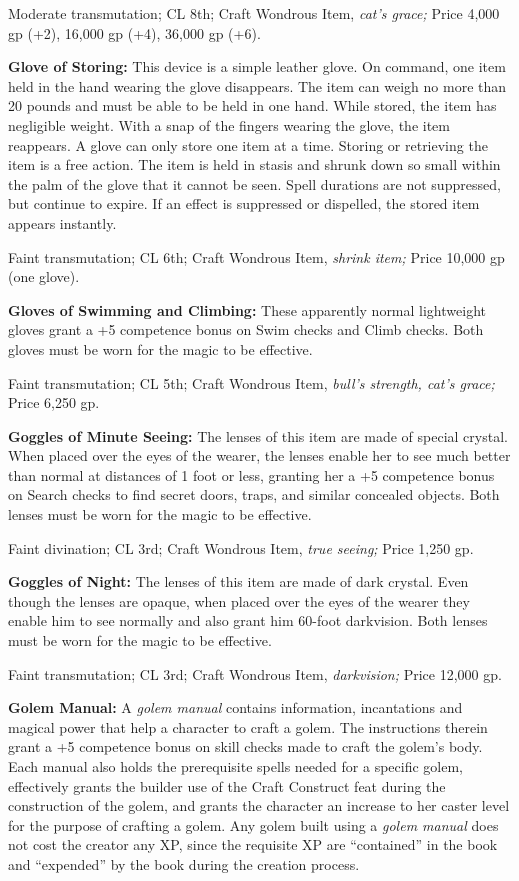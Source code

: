 Moderate transmutation; CL 8th; Craft Wondrous Item, \textit{cat's grace; }Price 
4,000 gp (+2), 16,000 gp (+4), 36,000 gp (+6).

\textbf{Glove of Storing:} This device is a simple leather glove. On command, one 
item held in the hand wearing the glove disappears. The item can weigh no more 
than 20 pounds and must be able to be held in one hand. While stored, the item 
has negligible weight. With a snap of the fingers wearing the glove, the item reappears. 
A glove can only store one item at a time. Storing or retrieving the item is a 
free action. The item is held in stasis and shrunk down so small within the palm 
of the glove that it cannot be seen. Spell durations are not suppressed, but continue 
to expire. If an effect is suppressed or dispelled, the stored item appears instantly.

Faint transmutation; CL 6th; Craft Wondrous Item, \textit{shrink item; }Price 10,000 
gp (one glove).

\textbf{Gloves of Swimming and Climbing: }These apparently normal lightweight gloves 
grant a +5 competence bonus on Swim checks and Climb checks. Both gloves must be 
worn for the magic to be effective.

Faint transmutation; CL 5th; Craft Wondrous Item, \textit{bull's strength, cat's 
grace; }Price 6,250 gp.

\textbf{Goggles of Minute Seeing:} The lenses of this item are made of special 
crystal. When placed over the eyes of the wearer, the lenses enable her to see 
much better than normal at distances of 1 foot or less, granting her a +5 competence 
bonus on Search checks to find secret doors, traps, and similar concealed objects. 
Both lenses must be worn for the magic to be effective.

Faint divination; CL 3rd; Craft Wondrous Item, \textit{true seeing; }Price 1,250 
gp.

\textbf{Goggles of Night:} The lenses of this item are made of dark crystal. Even 
though the lenses are opaque, when placed over the eyes of the wearer they enable 
him to see normally and also grant him 60-foot darkvision. Both lenses must be 
worn for the magic to be effective.

Faint transmutation; CL 3rd; Craft Wondrous Item, \textit{darkvision; }Price 12,000 
gp.

\textbf{Golem Manual: }A \textit{golem manual }contains information, incantations 
and magical power that help a character to craft a golem. The instructions therein 
grant a +5 competence bonus on skill checks made to craft the golem's body. Each 
manual also holds the prerequisite spells needed for a specific golem, effectively 
grants the builder use of the Craft Construct feat during the construction of the 
golem, and grants the character an increase to her caster level for the purpose 
of crafting a golem. Any golem built using a \textit{golem manual }does not cost 
the creator any XP, since the requisite XP are ``contained'' in the book and ``expended'' 
by the book during the creation process.

